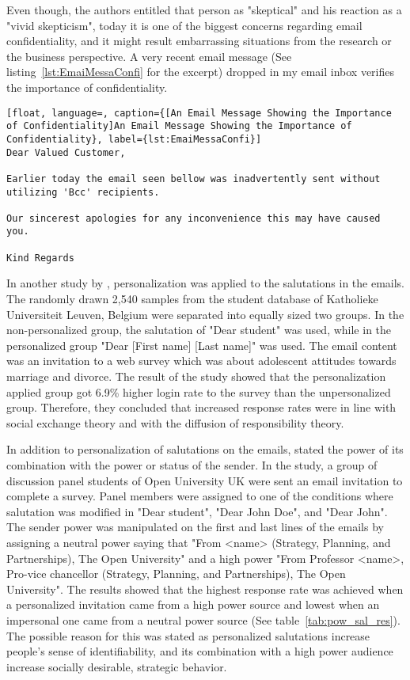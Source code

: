 Even though, the authors entitled that person as "skeptical" and his reaction as a "vivid skepticism", today it is one of the biggest concerns regarding email confidentiality, and it might result embarrassing situations from the research or the business perspective. A very recent email message (See listing~\ref{lst:EmaiMessaConfi} for the excerpt) dropped in my email inbox verifies the importance of confidentiality.  
\vspace{1cm}

\begin{lstlisting}[float, language=, caption={[An Email Message Showing the Importance of Confidentiality]An Email Message Showing the Importance of Confidentiality}, label={lst:EmaiMessaConfi}]
Dear Valued Customer,

Earlier today the email seen bellow was inadvertently sent without utilizing 'Bcc' recipients.

Our sincerest apologies for any inconvenience this may have caused you.

Kind Regards
\end{lstlisting}

In another study by \cite{Heerwegh2005}, personalization was applied to the salutations in the emails. The randomly drawn 2,540 samples from the student database of Katholieke Universiteit Leuven, Belgium were separated into equally sized two groups. In the non-personalized group, the salutation of "Dear student" was used, while in the personalized group "Dear [First name] [Last name]" was used. The email content was an invitation to a web survey which was about adolescent attitudes towards marriage and divorce. The result of the study showed that the personalization applied group got 6.9\% higher login rate to the survey than the unpersonalized group. Therefore, they concluded that increased response rates were in line with social exchange theory and with the diffusion of responsibility theory.
\vspace{1cm}

In addition to personalization of salutations on the emails, \cite{Joinson2007} stated the power of its combination with the power or status of the sender. In the study, a group of discussion panel students of Open University UK were sent an email invitation to complete a survey. Panel members were assigned to one of the conditions where salutation was modified in "Dear student", "Dear John Doe", and "Dear John". The sender power was manipulated on the first and last lines of the emails by assigning a neutral power saying that "From <name> (Strategy, Planning, and Partnerships), The Open University" and a high power "From Professor <name>, Pro-vice chancellor (Strategy, Planning, and Partnerships), The Open University". The results showed that the highest response rate was achieved when a personalized invitation came from a high power source and lowest when an impersonal one came from a neutral power source (See table~\ref{tab:pow_sal_res}). The possible reason for this was stated as personalized salutations increase people's sense of identifiability,  and its combination with a high power audience increase socially desirable, strategic behavior.

